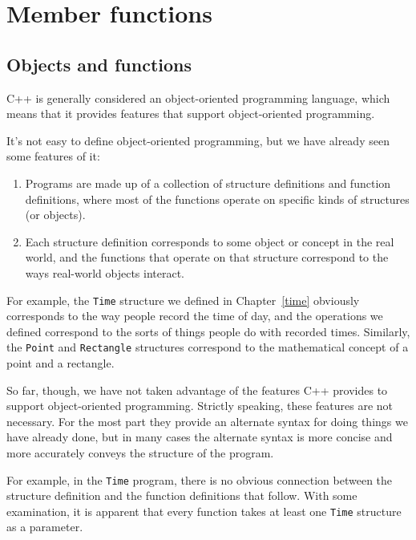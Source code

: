 

\chapter{Member functions}

\section{Objects and functions}

C++ is generally considered an object-oriented programming language,
which means that it provides features that support object-oriented
programming.

It's not easy to define object-oriented programming, but we have
already seen some features of it:

\begin{enumerate}

\item Programs are made up of a collection of structure definitions
and function definitions, where most of the functions operate on
specific kinds of structures (or objects).

\item Each structure definition corresponds to some
object or concept in the real world, and the functions that operate
on that structure correspond to the ways real-world objects interact.

\end{enumerate}

For example, the {\tt Time} structure we defined in Chapter~\ref{time}
obviously corresponds to the way people record the time of day,
and the operations we defined correspond to the sorts of things
people do with recorded times.  Similarly, the {\tt Point} and
{\tt Rectangle} structures correspond to the mathematical concept
of a point and a rectangle.

So far, though, we have not taken advantage of the features C++
provides to support object-oriented programming.  Strictly speaking,
these features are not necessary.  For the most part they provide
an alternate syntax for doing things we have already done, but
in many cases the alternate syntax is more concise and more
accurately conveys the structure of the program.

For example, in the {\tt Time} program, there is
no obvious connection between the structure definition and the
function definitions that follow.  With some examination, it
is apparent that every function takes at least one {\tt Time}
structure as a parameter.

